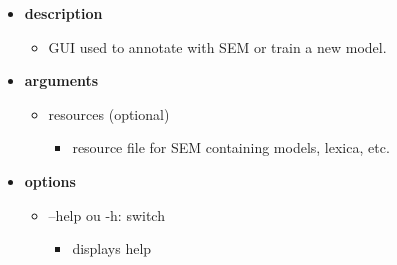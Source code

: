 \documentclass[manual-fr.tex]{subfiles}
\begin{document}
\begin{itemize}
    \item[] \textbf{description}
        \begin{itemize}
            \item[] GUI used to annotate with SEM or train a new model.
        \end{itemize}
    \item[] \textbf{arguments}
        \begin{itemize}
            \item[] resources (optional)
                \begin{itemize}
                    \item[] resource file for SEM containing models, lexica, etc.
                \end{itemize}
        \end{itemize}
    \item[] \textbf{options}
        \begin{itemize}
            \item[] --help ou -h: switch
                \begin{itemize}
                    \item[] displays help
                \end{itemize}
        \end{itemize}
\end{itemize}
\end{document}
